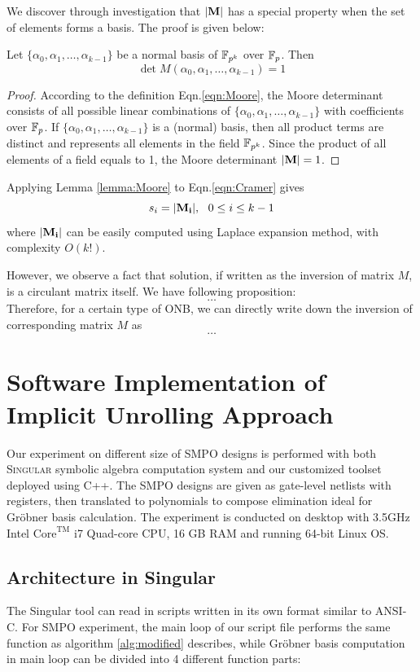 We discover through investigation that ${|\bf M}|$ has a special property when the set of elements forms a basis. The proof is given below:
\begin{Lemma}
\label{lemma:Moore}
Let $\{\alpha_0,\alpha_1,\dots,\alpha_{k-1}\}$ be a normal basis of ${\mathbb{F}}_{p^k}$ over ${\mathbb{F}}_{p}$. Then
\begin{equation}
\det{M(\alpha_0,\alpha_1,\dots,\alpha_{k-1})} = 1
\end{equation}
\end{Lemma}
\begin{proof}
According to the definition Eqn.\ref{eqn:Moore}, the Moore determinant consists of all possible linear combinations of 
$\{\alpha_0,\alpha_1,\dots,\alpha_{k-1}\}$ with coefficients over ${\mathbb{F}}_{p}$. If $\{\alpha_0,\alpha_1,\dots,\alpha_{k-1}\}$
is a (normal) basis, then all product terms are distinct and represents all elements in the field ${\mathbb{F}}_{p^k}$. Since the product 
of all elements of a field equals to 1, the Moore determinant ${|\bf M}|=1$.
\end{proof}
Applying Lemma \ref{lemma:Moore} to Eqn.\ref{eqn:Cramer} gives
\begin{equation}
s_i = {|\bf M_i|},~~0\leq i\leq k-1
\end{equation}
where ${|\bf M_i|}$ can be easily computed using Laplace expansion method, with complexity $O(k!)$.

However, we observe a fact that solution, if written as the inversion of matrix $M$, is a circulant matrix itself.
We have following proposition:
$$\dots$$
Therefore, for a certain type of ONB, we can directly write down the inversion of corresponding matrix $M$
as 
$$\dots$$

\section{Software Implementation of Implicit Unrolling Approach}
Our experiment on different size of SMPO designs is performed with both \textsc{Singular} \cite{DGPS}
symbolic algebra computation system and our customized toolset deployed using C++.
The SMPO designs are given as gate-level netlists with registers, then translated to polynomials to compose
elimination ideal for Gr\"obner basis calculation. The experiment is conducted on desktop with
3.5GHz Intel $\text{Core}^\text{TM}$ i7 Quad-core CPU, 16 GB RAM and running 64-bit Linux OS.
\subsection{Architecture in Singular}
The Singular tool can read in scripts written in its own format similar to ANSI-C. For SMPO experiment, the main 
loop of our script file performs the same function as algorithm \ref{alg:modified} describes, while Gr\"obner basis
computation in main loop can be divided into 4 different function parts:

